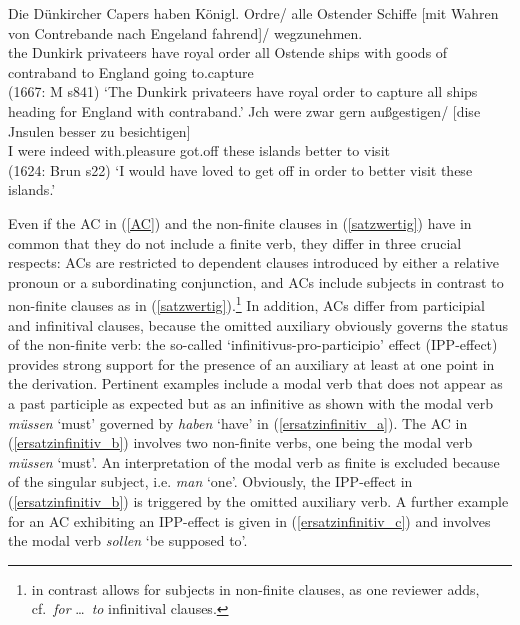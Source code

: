 \documentclass[output=paper,colorlinks,citecolor=brown]{langscibook}
\begin{document}
\eal \label{satzwertig}
\ex
\gll Die Dünkircher Capers haben Königl. Ordre/ alle Ostender Schiffe [mit Wahren von Contrebande nach Engeland fahrend]/
wegzunehmen.  \\ 
     the Dunkirk privateers have royal order all Ostende ships with goods of contraband to England going to.capture \\  \hfill (1667: M s841)
\glt `The Dunkirk privateers have royal order to capture all ships heading for England with contraband.'
\ex
\gll Jch were zwar gern außgestigen/ [dise Jnsulen besser zu besichtigen] \\ I were indeed with.pleasure got.off these islands better to visit    \\ \hfill (1624: Brun s22)
\glt `I would have loved to get off in order to better visit these islands.'
\zl

\noindent
Even if the AC in (\ref{AC}) and the non-finite clauses in (\ref{satzwertig}) have in common that
they do not include a finite verb, they differ in three crucial respects: ACs are restricted to
dependent clauses introduced by either a relative pronoun or a subordinating conjunction, and ACs
include subjects in contrast to non-finite clauses as in (\ref{satzwertig}).\footnote{ in
  contrast allows for subjects in non-finite clauses, as one reviewer adds, cf.\ \textit{for} \dots\
  \textit{to} infinitival clauses.} In addition, ACs differ from participial and infinitival
clauses, because the omitted auxiliary obviously governs the status of the non-finite verb: the
so-called `infinitivus-pro-participio' effect (IPP-effect) provides strong support for the presence
of an auxiliary at least at one point in the derivation. Pertinent examples include a modal verb
that does not appear as a past participle as expected but as an infinitive as shown with the modal
verb \textit{müssen} `must' governed by \textit{haben} `have' in (\ref{ersatzinfinitiv_a}). The AC
in (\ref{ersatzinfinitiv_b}) involves two non-finite verbs, one being the modal verb \textit{müssen}
`must'. An interpretation of the modal verb as finite is excluded because of the singular subject,
i.e. \textit{man} `one'. Obviously, the IPP-effect in (\ref{ersatzinfinitiv_b}) is triggered by the
omitted auxiliary verb. A further example for an AC exhibiting an IPP-effect is given in
(\ref{ersatzinfinitiv_c}) and involves the modal verb \textit{sollen} `be supposed to'.
\end{document}
